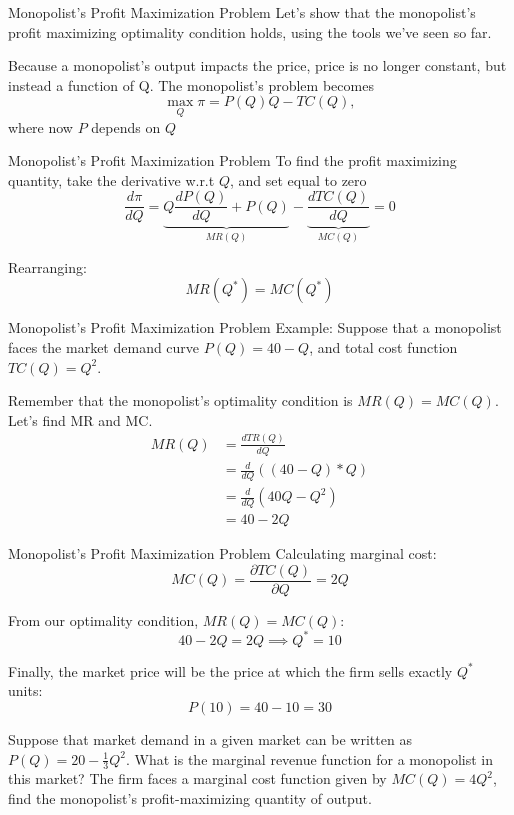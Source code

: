 \documentclass[11pt,t]{beamer}
\begin{document}
\begin{frame}{Monopolist's Profit Maximization Problem}
  Let's show that the monopolist's profit maximizing optimality condition holds, using the tools we've seen so far.

  \bigskip
  Because a monopolist's output impacts the price, price is no longer constant, but instead a function of Q. The monopolist's problem becomes
  $$
    \max_Q \pi= P(Q) Q - TC(Q),
  $$
  where now $P$ depends on $Q$
\end{frame}

\begin{frame}{Monopolist's Profit Maximization Problem}
  To find the profit maximizing quantity, take the derivative w.r.t $Q$, and set equal to zero
  $$
    \frac{d\pi}{dQ} = \underbrace{Q \frac{dP(Q)}{dQ} + P(Q)}_{MR(Q)} - \underbrace{\frac{dTC(Q)}{dQ}}_{MC(Q)} = 0
  $$

  \bigskip
  Rearranging:
  $$
    MR(Q^*)=MC(Q^*)
  $$
\end{frame}

\begin{frame}{Monopolist's Profit Maximization Problem}
  Example: Suppose that a monopolist faces the market demand curve $P(Q) = 40 - Q$, and total cost function $TC(Q) = Q^2$.

  \bigskip
  Remember that the monopolist's optimality condition is $MR(Q) = MC(Q)$. Let's find MR and MC.
  \begin{align*}
    MR(Q) &= \frac{dTR(Q)}{dQ}      \\
          &= \frac{d}{dQ}((40 - Q) * Q) \\
          &= \frac{d}{dQ}(40Q - Q^2)  \\
          &= 40 - 2Q
  \end{align*}
\end{frame}

\begin{frame}{Monopolist's Profit Maximization Problem}
  Calculating marginal cost:
  $$
    MC(Q) = \frac{\partial TC(Q)}{\partial Q} = 2Q
  $$ 

  \bigskip\pause
  From our optimality condition, $MR(Q) = MC(Q)$:
  $$
    40 - 2Q = 2Q \implies Q^* = 10
  $$

  \bigskip\pause
  Finally, the market price will be the price at which the firm sells exactly $Q^*$ units:
  $$
    P(10) = 40-10=30
  $$
\end{frame}

\begin{frame}{}
  Suppose that market demand in a given market can be written as $P(Q) = 20 - \frac{1}{3} Q^2$. What is the marginal revenue function for a monopolist in this market?
  \pause The firm faces a marginal cost function given by $MC(Q) = 4Q^2$, find the monopolist's profit-maximizing quantity of output.
\end{frame}
\end{document}
